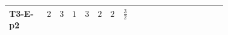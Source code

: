 \documentclass[8pt]{article}
\begin{document}
\begin{landscape}
\begin{longtable}{@{}llcccccc >{\raggedright\arraybackslash}p{0.21\linewidth} >{\raggedright\arraybackslash}p{0.21\linewidth}@{}}
\midrule
T3-E-p2 & $2$ & $3$ & $1$ & $3$ & $2$ & $2$ & $\frac{3}{2}$ & \scriptsize\adjustbox{max width=\linewidth}{$\begin{gathered} 6 C_{5} Y_d Y_d^\dagger\end{gathered}$} & \scriptsize\adjustbox{max width=\linewidth}{$\begin{gathered} 6 C_{5} Y_u Y_u^\dagger\end{gathered}$} \\
\midrule
\bottomrule
\end{longtable}
\end{landscape}
\end{document}
